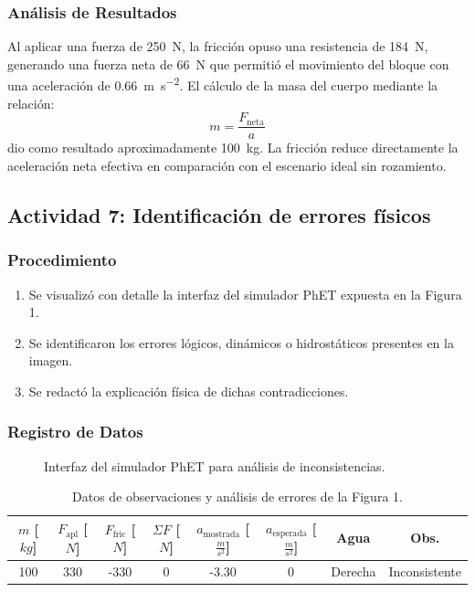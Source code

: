 \documentclass[11pt,a4paper]{article}
\begin{document}
\subsubsection{Análisis de Resultados}
Al aplicar una fuerza de \SI{250}{\newton}, la fricción opuso una resistencia de \SI{184}{\newton}, generando una fuerza neta de \SI{66}{\newton} que permitió el movimiento del bloque con una aceleración de \SI{0.66}{\meter\per\second\squared}. El cálculo de la masa del cuerpo mediante la relación:
\begin{equation}
    m = \frac{F_{\text{neta}}}{a}
\end{equation}
dio como resultado aproximadamente \SI{100}{\kilogram}. La fricción reduce directamente la aceleración neta efectiva en comparación con el escenario ideal sin rozamiento.

\subsection{Actividad 7: Identificación de errores físicos}
\subsubsection{Procedimiento}
\begin{enumerate}
    \item Se visualizó con detalle la interfaz del simulador PhET expuesta en la Figura 1.
    \item Se identificaron los errores lógicos, dinámicos o hidrostáticos presentes en la imagen.
    \item Se redactó la explicación física de dichas contradicciones.
\end{enumerate}

\subsubsection{Registro de Datos}
\begin{figure}[H]
    \centering
    \caption{Interfaz del simulador PhET para análisis de inconsistencias.}
\end{figure}

\begin{table}[H]
\centering
\caption{Datos de observaciones y análisis de errores de la Figura 1.}
\begin{tabularx}{\textwidth}{@{} c c c c c c c c @{}}
\toprule
\textbf{$m$ [$kg$]} & \textbf{$F_{\text{apl}}$ [$N$]} & \textbf{$F_{\text{fric}}$ [$N$]} & \textbf{$\Sigma F$ [$N$]} & \textbf{$a_{\text{mostrada}}$ [$\frac{m}{s^2}$]} & \textbf{$a_{\text{esperada}}$ [$\frac{m}{s^2}$]} & \textbf{Agua} & \textbf{Obs.} \\ \midrule
100 & 330 & -330 & 0 & -3.30 & 0 & Derecha & Inconsistente \\
\bottomrule
\end{tabularx}
\end{table}
\end{document}
